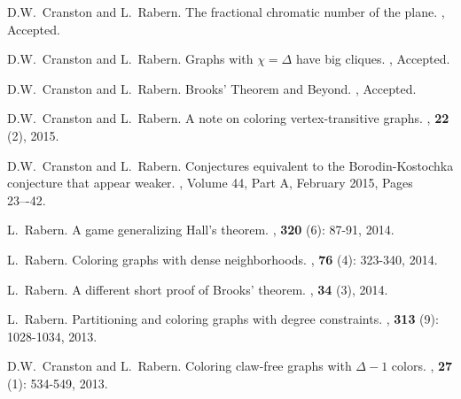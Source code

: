 \documentclass[margin,line]{res}
\begin{document}
\begin{resume}
\begin{enumerate}[{[}1{]}]
	\item
	D.W.~Cranston and L.~Rabern.
	\newblock The fractional chromatic number of the plane.
	, Accepted.
	\smallskip
	
	\item
	D.W.~Cranston and L.~Rabern.
	\newblock Graphs with $\chi = \Delta$ have big cliques.
	, Accepted.
	\smallskip
	
	\item
	D.W.~Cranston and L.~Rabern.
	\newblock Brooks' Theorem and Beyond.
	, Accepted.
	
	\smallskip
	
\item D.W.~Cranston and L.~Rabern.
\newblock A note on coloring vertex-transitive graphs.
, \textbf{22} (2), 2015.

\smallskip

\item
D.W.~Cranston and L.~Rabern.
\newblock Conjectures equivalent to the Borodin-Kostochka conjecture that appear weaker.
, Volume 44, Part A, February 2015, Pages 23–-42.

\smallskip

\item
L.~Rabern.
\newblock A game generalizing Hall's theorem.
, \textbf{320} (6): 87-91, 2014.

\smallskip

\item
L.~Rabern.
\newblock Coloring graphs with dense neighborhoods.
, \textbf{76} (4): 323-340, 2014.

\smallskip

\item
L.~Rabern.
\newblock A different short proof of Brooks' theorem.
,  \textbf{34} (3), 2014.

\smallskip

\item
L.~Rabern.
\newblock Partitioning and coloring graphs with degree constraints.
, \textbf{313} (9): 1028-1034, 2013.

\smallskip

\item
D.W.~Cranston and L.~Rabern.
\newblock Coloring claw-free graphs with $\Delta - 1$ colors.
, \textbf{27} (1): 534-549, 2013.


\end{enumerate}
\end{resume}
\end{document}

